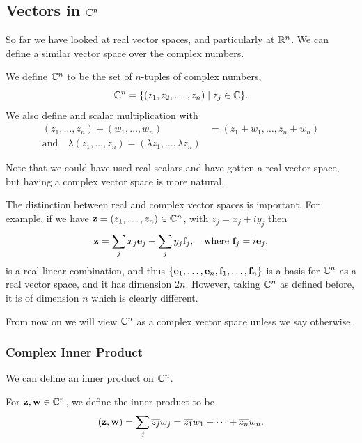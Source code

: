 \documentclass[a4paper]{scrartcl}
\begin{document}
\subsection{Vectors in $\C^n$}

So far we have looked at real vector spaces, and particularly at $\mathbb{R}^n$. We can define a similar vector space over the complex numbers.

\begin{definition}[$\C^n$ Space]
    We define $\C^n$ to be the set of $n$-tuples of complex numbers,
    $$
    \mathbb{C}^n = \{(z_1, z_2, \dots, z_n) \mid z_j \in \mathbb{C}\}.
    $$
    We also define  and scalar multiplication with
    \begin{align*}
        \left(z_{1}, \ldots, z_{n}\right)+\left(w_{1}, \ldots, w_{n}\right)&=\left(z_{1}+w_{1}, \ldots, z_{n}+w_{n}\right) \\
        \text{and} \quad \lambda\left(z_{1}, \ldots, z_{n}\right)=\left(\lambda z_{1}, \ldots, \lambda z_{n}\right) 
    \end{align*}
\end{definition}

Note that we could have used real scalars and have gotten a real vector space, but having a complex vector space is more natural. 

The distinction between real and complex vector spaces is important. For example, if we have $\mathbf{z} = (z_1, \dots, z_n) \in \mathbb{C}^n$, with $z_j = x_j + i y_j$ then
$$
\mathbf{z} = \sum_j x_j \mathbf{e}_j + \sum_j y_j \mathbf{f}_j, \quad \text{where } \mathbf{f}_j = i \mathbf{e}_j,
$$
is a real linear combination, and thus $\{\mathbf{e}_1, \dots, \mathbf{e}_n, \mathbf{f}_1, \dots, \mathbf{f}_n\}$ is a basis for $\C^n$ as a real vector space, and it has dimension $2n$. However, taking $\C^n$ as defined before, it is of dimension $n$ which is clearly different.

From now on we will view $\C^n$ as a complex vector space unless we say otherwise.

\subsubsection{Complex Inner Product}

We can define an inner product on $\C^n$.

\begin{definition}
    For $\mathbf{z}, \mathbf{w} \in \mathbb{C}^n$, we define the inner product to be
    $$
    (\mathbf{z}, \mathbf{w}) = \sum_j \overline{z_j} w_j = \overline{z_1} w_1 + \cdots + \overline{z_n} w_n.
    $$
\end{definition}
\end{document}
